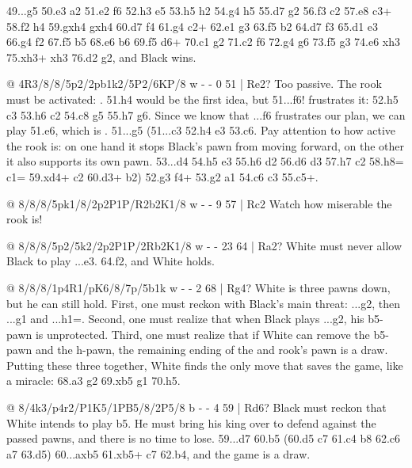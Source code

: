 49...g5 50.\K e3 \R a2 51.\B e2 \K f6 52.h3 \K e5 53.\B h5 \R h2 54.\B g4 h5 55.\B d7 \R g2 56.\K f3
\R c2 57.\B e8 \R c3+ 58.\K f2 h4 59.gxh4 gxh4 60.\B d7 \K f4 61.\B g4 \R c2+ 62.\K e1 \K g3
63.\B f5 \R b2 64.\B d7 \K f3 65.\K d1 \K e3 66.\B g4 \K f2 67.\B f5 \R b5 68.\B e6 \R b6 69.\B f5
\R d6+ 70.\K c1 \K g2 71.\K c2 \R f6 72.\B g4 \R g6 73.\B f5 \R g3 74.\B e6 \R xh3 75.\B xh3+ \K xh3
76.\K d2 \K g2, and Black wins.

@ 4R3/8/8/5p2/2pb1k2/5P2/6KP/8 w - - 0 51 | Re2?
Too passive. The rook must be activated:
.
51.h4 would be the first idea, but 51...\B f6! frustrates it: 52.h5 c3 53.h6 c2 54.\R c8 \K g5
55.h7 \K g6. Since we know that ...\B f6 frustrates our plan, we can play 51.\R e6, which is
. 51...\K g5 (51...c3 52.h4 \B e3 53.\R c6. Pay
attention to how active the rook is: on one hand it stops Black's pawn from moving forward, on the
other it also supports its own pawn. 53...\B d4 54.h5 \K e3 55.h6 \K d2 56.\R d6 \K d3 57.h7 c2
58.h8=\Q{} c1=\Q{} 59.\Q xd4+ \K c2 60.\Q d3+ \K b2) 52.\K g3 f4+ 53.\K g2 \B a1 54.\R c6 c3
55.\R c5+.

@ 8/8/8/5pk1/8/2p2P1P/R2b2K1/8 w - - 9 57 | Rc2
Watch how miserable the rook is!

@ 8/8/8/5p2/5k2/2p2P1P/2Rb2K1/8 w - - 23 64 | Ra2?
White must never allow Black to play ...\K e3. 64.\K f2, and White holds.

@ 8/8/8/1p4R1/pK6/8/7p/5b1k w - - 2 68 | Rg4?
White is three pawns down, but he can still hold. First, one must reckon with Black's main threat:
...\B g2, then ...\K g1 and ...h1=\Q. Second, one must realize that when Black plays ...\B g2, his
b5-pawn is unprotected. Third, one must realize that if White can remove the b5-pawn and the
h-pawn, the remaining ending of the  and rook's pawn is a
draw. Putting these three
together, White finds the only move that saves the game, like a miracle:
68.\K a3 \B g2 69.\R xb5 \K g1 70.\R h5.

@ 8/4k3/p4r2/P1K5/1PB5/8/2P5/8 b - - 4 59 | Rd6?
Black must reckon that White intends to play b5. He must bring his king over to defend against the
passed pawns, and there is no time to lose. 59...\K d7 60.b5
(60.\B d5 \K c7 61.c4 \K b8 62.\B c6 \K a7 63.\B d5) 60...axb5 61.\B xb5+ \K c7 62.\K b4, and the game is a draw.

